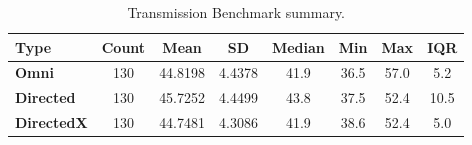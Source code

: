 \renewcommand{\arraystretch}{1.2}%
\begin{table}[H]
\begin{center}
\caption{Transmission Benchmark summary.}
\label{tab:tbs}
\begin{adjustbox}{max width=\textwidth}
\begin{tabular}{| l || c | c | c | c | c | c | c |}
\hline
\rowcolor{lightgray}
\textbf{Type} & \textbf{Count} & \textbf{Mean} & \textbf{SD}  & \textbf{Median} & \textbf{Min} & \textbf{Max}  & \textbf{IQR}\tabularnewline \hline \hline 
\cellcolor{lightgray} \textbf{Omni}      & 130 & 44.8198 & 4.4378 & 41.9 & 36.5 & 57.0 & 5.2 \tabularnewline \hline
\cellcolor{lightgray} \textbf{Directed}  & 130 & 45.7252 & 4.4499 & 43.8 & 37.5 & 52.4 & 10.5 \tabularnewline \hline
\cellcolor{lightgray} \textbf{DirectedX} & 130 & 44.7481 & 4.3086 & 41.9 & 38.6 & 52.4 & 5.0 \tabularnewline \hline
\end{tabular}
\end{adjustbox}
\end{center}
\end{table}
\renewcommand{\arraystretch}{1}%



% 

% 


